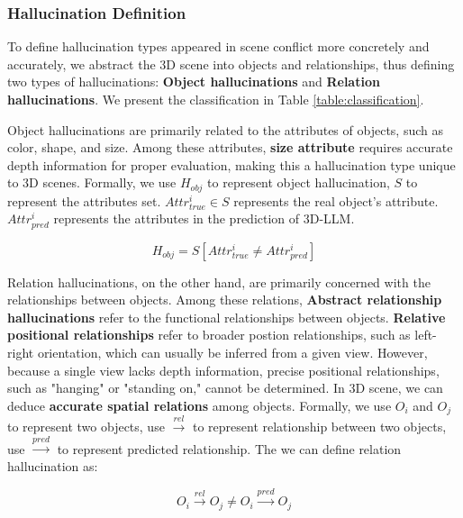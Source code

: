 \subsubsection{Hallucination Definition}

To define hallucination types appeared in scene conflict more concretely and accurately, we abstract the 3D scene into objects and relationships, thus defining two types of hallucinations: \textbf{Object hallucinations} and \textbf{Relation hallucinations}. We present the classification in Table \ref{table:classification}.

Object hallucinations are primarily related to the attributes of objects, such as color, shape, and size. Among these attributes, \textbf{size attribute} requires accurate depth information for proper evaluation, making this a hallucination type unique to 3D scenes. Formally, we use \(H_{obj}\) to represent object hallucination, \(S\) to represent the attributes set. \(Attr^{i}_{true} \in S\) represents the real object's attribute. \(Attr^{i}_{pred}\) represents the attributes in the prediction of 3D-LLM. 

\begin{equation}
    H_{obj} = S[Attr^{i}_{true} \neq Attr^{i}_{pred}]
\end{equation}


Relation hallucinations, on the other hand, are primarily concerned with the relationships between objects.
Among these relations, \textbf{Abstract relationship hallucinations} refer to the functional relationships between objects. \textbf{Relative positional relationships} refer to broader postion relationships, such as left-right orientation, which can usually be inferred from a given view. However, because a single view lacks depth information, precise positional relationships, such as "hanging" or "standing on," cannot be determined. In 3D scene, we can deduce \textbf{accurate spatial relations} among objects. Formally, we use \(O_i\) and \(O_j\) to represent two objects, use \(\stackrel{rel}{\longrightarrow}\) to represent relationship between two objects, use \(\stackrel{pred}{\longrightarrow}\) to represent predicted relationship. The we can define relation hallucination as:

\begin{equation}
    O_i \stackrel{rel}{\longrightarrow} O_j \neq O_i \stackrel{pred}{\longrightarrow} O_j
\end{equation}
